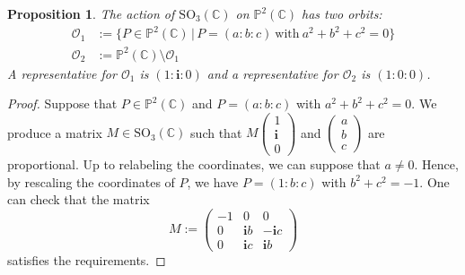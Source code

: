 \documentclass[12pt, a4paper, reqno, captions=tableheading,bibliography=totoc]{scrartcl}
\theoremstyle{plain}
\newtheorem{prop}[lemma]{Proposition}
\theoremstyle{definition}
\newcommand{\C}{\mathbb{C}}
\newcommand{\p}{\mathbb{P}}
\newcommand{\iii}{\textbf{i}}
\begin{document}
\begin{prop}
\label{two_orbits}
 The action of $\mathrm{SO}_3(\mathbb{C})$ on $\p^2(\C)$ has two orbits:
 \begin{align*}
  \mathcal{O}_1 &:=
  \bigl\{
   P \in \p^2(\C) \, | \,
   P = (a:b:c) \  \text{with} \  a^2 + b^2 + c^2 = 0
  \bigr\} \\
  \mathcal{O}_2 &:= \p^2(\C) \setminus \mathcal{O}_1
 \end{align*}
 A representative for $\mathcal{O}_1$ is $(1:\iii:0)$ and a
representative for $\mathcal{O}_2$ is $(1:0:0)$.
\end{prop}
\begin{proof}
 Suppose that $P \in \p^2(\C)$ and $P = (a:b:c)$ with $a^2 + b^2 + c^2 = 0$.
 We produce a matrix $M \in \mathrm{SO}_3(\C)$ such that $M \left(\begin{smallmatrix} 1 \\ \iii \\ 0 \end{smallmatrix}\right)$ and $\left(\begin{smallmatrix} a \\ b \\ c \end{smallmatrix}\right)$ are proportional.
 Up to relabeling the coordinates, we can suppose that $a \neq 0$.
 Hence, by rescaling the coordinates of $P$, we have $P = (1: b: c)$ with $b^2 + c^2 = -1$.
 One can check that the matrix
 \[
  M :=
  \begin{pmatrix}
   -1 & 0 & 0 \\
   0 & \iii b & -\iii c \\
   0 & \iii c & \iii b
  \end{pmatrix}
 \]
 satisfies the requirements.


\end{proof}
\end{document}
